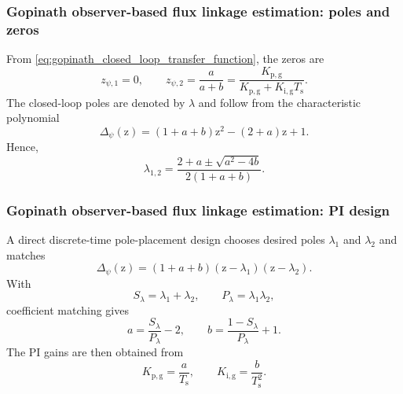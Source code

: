 \begin{frame}
    \frametitle{Gopinath observer-based flux linkage estimation: poles and zeros}
    From \eqref{eq:gopinath_closed_loop_transfer_function}, the zeros are
    \begin{equation}
        z_{\psi,1}=0,
        \qquad
        z_{\psi,2}
        =\frac{a}{a+b}
        =\frac{K_{\mathrm{p,g}}}{K_{\mathrm{p,g}}+K_{\mathrm{i,g}}T_\mathrm{s}} .
    \end{equation}\pause%
    The closed-loop poles are denoted by $\lambda$ and follow from the characteristic polynomial
    \begin{equation}
        \Delta_\psi(\mathrm{z})
        =(1+a+b)\mathrm{z}^2-(2+a)\mathrm{z}+1.
    \end{equation}\pause%
    Hence,
    \begin{equation}
        \lambda_{1,2}
        =
        \frac{2+a\pm\sqrt{a^2-4b}}{2(1+a+b)} .
    \end{equation}
\end{frame}


\begin{frame}
    \frametitle{Gopinath observer-based flux linkage estimation: PI design}
    A direct discrete-time pole-placement design chooses desired poles $\lambda_1$ and $\lambda_2$ and matches
    \begin{equation}
        \Delta_\psi(\mathrm{z})
        =(1+a+b)(\mathrm{z}-\lambda_1)(\mathrm{z}-\lambda_2).
    \end{equation}\pause%
    With
    \begin{equation}
        S_\lambda=\lambda_1+\lambda_2,
        \qquad
        P_\lambda=\lambda_1\lambda_2,
    \end{equation}\pause%
    coefficient matching gives
    \begin{equation}
        a=\frac{S_\lambda}{P_\lambda}-2,
        \qquad
        b=\frac{1-S_\lambda}{P_\lambda}+1 .
        \label{eq:gopinath_discrete_pole_placement_addendum}
    \end{equation}\pause%
    The PI gains are then obtained from
    \begin{equation}
        K_{\mathrm{p,g}}=\frac{a}{T_\mathrm{s}},
        \qquad
        K_{\mathrm{i,g}}=\frac{b}{T_\mathrm{s}^2} .
    \end{equation}
\end{frame}

